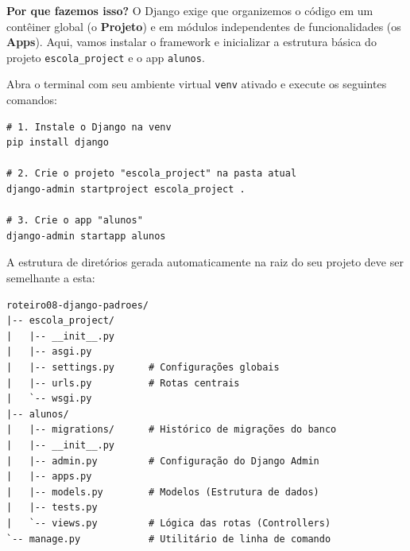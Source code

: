 \documentclass[12pt,a4paper]{article}
\begin{document}
\begin{boxAtividade}
\textbf{Por que fazemos isso?} O Django exige que organizemos o código em um contêiner global (o \textbf{Projeto}) e em módulos independentes de funcionalidades (os \textbf{Apps}). Aqui, vamos instalar o framework e inicializar a estrutura básica do projeto \texttt{escola\_project} e o app \texttt{alunos}.

Abra o terminal com seu ambiente virtual \texttt{venv} ativado e execute os seguintes comandos:
\begin{boxCodigo}
\begin{verbatim}
# 1. Instale o Django na venv
pip install django

# 2. Crie o projeto "escola_project" na pasta atual
django-admin startproject escola_project .

# 3. Crie o app "alunos"
django-admin startapp alunos
\end{verbatim}
\end{boxCodigo}

A estrutura de diretórios gerada automaticamente na raiz do seu projeto deve ser semelhante a esta:
\begin{boxCodigo}
\begin{verbatim}
roteiro08-django-padroes/
|-- escola_project/
|   |-- __init__.py
|   |-- asgi.py
|   |-- settings.py      # Configurações globais
|   |-- urls.py          # Rotas centrais
|   `-- wsgi.py
|-- alunos/
|   |-- migrations/      # Histórico de migrações do banco
|   |-- __init__.py
|   |-- admin.py         # Configuração do Django Admin
|   |-- apps.py
|   |-- models.py        # Modelos (Estrutura de dados)
|   |-- tests.py
|   `-- views.py         # Lógica das rotas (Controllers)
`-- manage.py            # Utilitário de linha de comando
\end{verbatim}
\end{boxCodigo}
\end{boxAtividade}

\newpage
\end{document}
